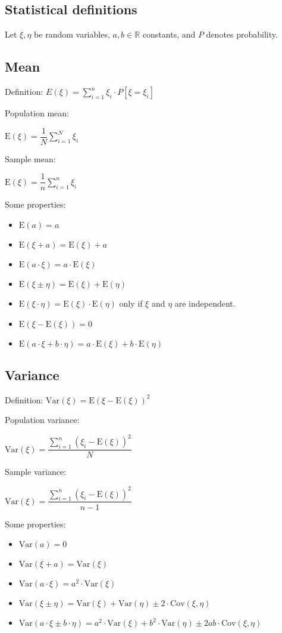 \documentclass[10pt, a4paper, landscape]{extarticle}
\newcommand{\E}{\mathrm{E}}
\newcommand{\Var}{\mathrm{Var}}
\newcommand{\Cov}{\mathrm{Cov}}
\begin{document}
\begin{multicols}{3}
\section*{Statistical definitions}
	Let $\xi, \eta$ be random variables, $a, b \in \mathbb{R}$ constants, and $P$ denotes probability.
	\subsection*{Mean}
	Definition: \quad $E(\xi) = \sum_{i=1}^{n} \xi_i \cdot P[\xi = \xi_i]$
	\begin{multicols}{2}
		Population mean:
		\begin{center}
			$\E(\xi) = \dfrac{1}{N} \sum_{i=1}^{N} \xi_i$
		\end{center}
		\columnbreak
		Sample mean:
		\begin{center}
			$\E(\xi) = \dfrac{1}{n} \sum_{i=1}^{n} \xi_i$
		\end{center}
	\end{multicols}
	Some properties:
	\begin{itemize}[leftmargin=*]
		\item $\E(a) = a$
		\item $\E(\xi + a) = \E(\xi) + a$
		\item $\E(a \cdot \xi) = a \cdot \E(\xi)$
		\item $\E(\xi \pm \eta) = \E(\xi) + \E(\eta)$
		\item $\E(\xi \cdot \eta) = \E(\xi) \cdot \E(\eta)$ \quad only if $\xi$ and $\eta$ are independent.
		\item $\E(\xi - \E(\xi)) = 0$
		\item $\E(a \cdot \xi + b \cdot \eta) = a \cdot \E(\xi) + b \cdot \E(\eta)$
	\end{itemize}
	\subsection*{Variance}
	Definition: \quad $\Var(\xi) = \E(\xi - \E(\xi))^2$
	\begin{multicols}{2}
		Population variance:
		\begin{center}
			$\Var(\xi) = \dfrac{\sum_{i=1}^{n} (\xi_i - \E(\xi))^2}{N}$
		\end{center}
		\columnbreak
		Sample variance:
		\begin{center}
			$\Var(\xi) = \dfrac{\sum_{i=1}^{n} (\xi_i - \E(\xi))^2}{n-1}$
		\end{center}
	\end{multicols}
	Some properties:
	\begin{itemize}[leftmargin=*]
		\item $\Var(a) = 0$
		\item $\Var(\xi + a) = \Var(\xi)$
		\item $\Var(a \cdot \xi) = a^2 \cdot \Var(\xi)$
		\item $\Var(\xi \pm \eta) = \Var(\xi) + \Var(\eta) \pm 2 \cdot \Cov(\xi, \eta)$
		\item $\Var(a \cdot \xi \pm b \cdot \eta) = a^2 \cdot \Var(\xi) + b^2 \cdot \Var(\eta) \pm 2 a b \cdot \Cov(\xi, \eta)$
	\end{itemize}

\end{multicols}
\end{document}

